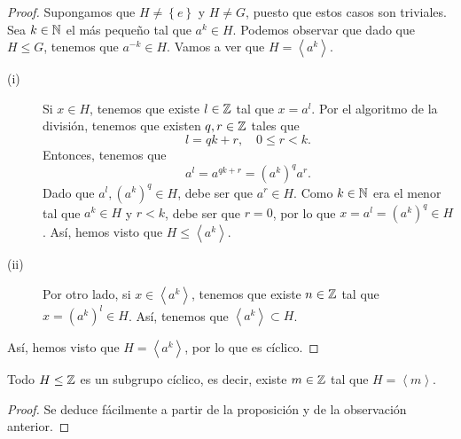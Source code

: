 \begin{proof}
	Supongamos que $\displaystyle H \neq \left\{ e\right\}  $ y $\displaystyle H \neq G $, puesto que estos casos son triviales. Sea $\displaystyle k \in \mathbb{N} $ el más pequeño tal que $\displaystyle a^{k} \in H $. Podemos observar que dado que $\displaystyle H \leq G $, tenemos que $\displaystyle a^{-k} \in H $. Vamos a ver que $\displaystyle H = \left\langle a^{k} \right\rangle  $.
	\begin{description}
	\item[(i)] Si $\displaystyle x \in H $, tenemos que existe $\displaystyle l \in \mathbb{Z} $ tal que $\displaystyle x = a^{l} $. Por el algoritmo de la división, tenemos que existen $\displaystyle q, r \in \mathbb{Z} $ tales que 
		\[l = qk + r, \quad 0 \leq r < k .\]
	Entonces, tenemos que 
	\[a^{l} = a^{qk + r} = \left(a^{k}\right)^{q}a^{r} .\]
	Dado que $\displaystyle a^{l}, \left(a^{k}\right)^{q} \in H $, debe ser que $\displaystyle a^{r} \in H $. Como $\displaystyle k \in \mathbb{N} $ era el menor tal que $\displaystyle a^{k} \in H $ y $\displaystyle r < k $, debe ser que $\displaystyle r = 0 $, por lo que $\displaystyle x = a^{l} = \left(a^{k}\right)^{q} \in H $. Así, hemos visto que $\displaystyle H \leq \left\langle a^{k} \right\rangle  $.
\item[(ii)] Por otro lado, si $\displaystyle x \in \left\langle a^{k} \right\rangle  $, tenemos que existe $\displaystyle n \in \mathbb{Z} $ tal que $\displaystyle x = \left(a^{k}\right)^{l} \in H $. Así, tenemos que $\displaystyle \left\langle a^{k} \right\rangle \subset H $.  
	\end{description}
	Así, hemos visto que $\displaystyle H = \left\langle a^{k} \right\rangle  $, por lo que es cíclico.
\end{proof}
\begin{colorary}
Todo $\displaystyle H \leq \mathbb{Z} $ es un subgrupo cíclico, es decir, existe $\displaystyle m \in \mathbb{Z} $ tal que $\displaystyle H = \left\langle m \right\rangle  $.
\end{colorary}
\begin{proof}
Se deduce fácilmente a partir de la proposición y de la observación anterior.
\end{proof}
